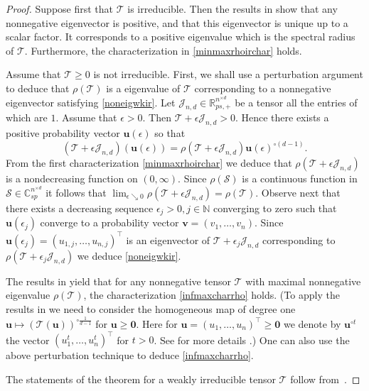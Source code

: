 \documentclass{amsart}
\newcommand{\C}{\mathbb{C}}
\newcommand{\N}{\mathbb{N}}
\newcommand{\R}{\mathbb{R}}
\newcommand{\uu}{\mathbf{u}}
\newcommand{\bv}{\mathbf{v}}
\newcommand{\0}{\mathbf{0}}
\newcommand{\1}{\mathbf{1}}
\newcommand{\cJ}{\mathcal{J}}
\newcommand{\cS}{\mathcal{S}}
\newcommand{\cT}{\mathcal{T}}
\newcommand{\trans}{^\top}
\theoremstyle{remark}
\numberwithin{equation}{section} %
\renewcommand{\ge}{\geqslant}
\begin{document}
%
\begin{proof}
 Suppose first that $\cT$ is irreducible.  Then the results in \cite{CPZ08} show that any nonnegative eigenvector is positive, and that this eigenvector
is unique up to a scalar factor. 
 It corresponds to a positive eigenvalue which is the spectral radius of $\cT$.  Furthermore, the characterization in \eqref{minmaxrhoirchar} holds.
%

 Assume that $\cT\ge 0$ is not irreducible.  First, we shall use
%
a perturbation argument to deduce that $\rho(\cT)$ is a eigenvalue of $\cT$ corresponding
 to a nonnegative eigenvector satisfying \eqref{noneigwkir}.  Let $\cJ_{n,d}\in\R_{ps,+}^{n^{\times d}}$ be a tensor all the entries of which are $1$.  Assume that $\epsilon>0$.  Then $\cT+\epsilon \cJ_{n,d}>0$.  Hence there exists a positive probability vector $\uu(\epsilon)$ so that
 \[(\cT+\epsilon\cJ_{n,d})(\uu(\epsilon))=\rho(\cT+\epsilon \cJ_{n,d})\uu(\epsilon)^{\circ(d-1)}.\]
 From the first characterization \eqref{minmaxrhoirchar} we deduce that $\rho(\cT+\epsilon\cJ_{n,d})$ is a nondecreasing function on $(0,\infty)$.
 Since $\rho(\cS)$ is a continuous function in $\cS\in \C^{n^{\times d}}_{sp}$ it follows that $\lim_{\epsilon\searrow 0}\rho(\cT+\epsilon\cJ_{n,d})=\rho(\cT)$.
 Observe next that there exists a decreasing sequence $\epsilon_j>0, j\in\N$ converging to zero such that $\uu(\epsilon_j)$ converge to a probability vector $\bv=(v_1,\ldots,v_n)$.    Since $\uu(\epsilon_j)=(u_{1,j},\ldots,u_{n,j})\trans$ is an eigenvector of $\cT+\epsilon_j\cJ_{n,d}$ corresponding to $\rho(\cT+\epsilon_j\cJ_{n,d})$ we deduce \eqref{noneigwkir}.
 
 The results in \cite[\S3]{nuss86} yield that for any nonnegative tensor $\cT$ with maximal nonnegative eigenvalue $\rho(\cT)$, the characterization \eqref{infmaxcharrho}
 holds.  (To apply the results in \cite{nuss86} we need to consider the homogeneous map of degree one $\uu\mapsto (\cT(\uu))^{\circ\frac{1}{d-1}}$ for $\uu\ge \0$.
 Here for $\uu=(u_1,\ldots,u_n)\trans\ge \0$ we denote by $\uu^{\circ t}$ the vector $(u_1^t,\ldots,u_n^t)\trans$ for $t>0$.  See for more details \cite{FGH}.)
 One can also use the above perturbation technique to deduce 
%
\eqref{infmaxcharrho}.

The statements of the theorem for a weakly irreducible tensor $\cT$ follow
from~\cite[Corollary 4.2]{FGH}.
\end{proof}
\end{document}
